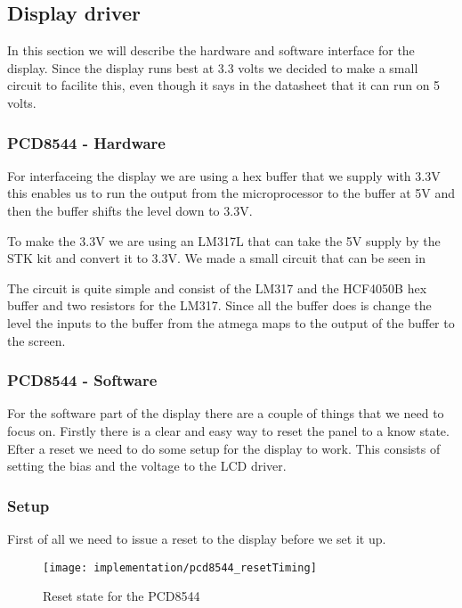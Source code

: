 \subsection{Display driver}
In this section we will describe the hardware and software interface for the display.
Since the display runs best at 3.3 volts we decided to make a small circuit to facilite this, 
even though it says in the datasheet\cite[p. 17]{philips:pcd8544} that it can run on 5 volts.

\subsubsection{PCD8544 - Hardware}
For interfaceing the display we are using a hex buffer that we supply with 3.3V this enables us to run the output from the
microprocessor to the buffer at 5V and then the buffer shifts the level down to 3.3V\cite[p. 1]{STMicroelectronics:HCF4050B}.

To make the 3.3V we are using an LM317L that can take the 5V supply by the STK kit and convert it to 3.3V. 
We made a small circuit that can be seen in 


The circuit is quite simple and consist of the LM317 and the HCF4050B hex buffer and two resistors for the LM317.
Since all the buffer does is change the level the inputs to the buffer from the atmega maps to the output of the buffer to the screen.


\subsubsection{PCD8544 - Software}
For the software part of the display there are a couple of things that we need to focus on. 
Firstly there is a clear and easy way to reset the panel to a know state. Efter a reset we need to do some setup for the display to work.
This consists of setting the bias and the voltage to the LCD driver.

\subsubsection{Setup}
First of all we need to issue a reset to the display before we set it up.

\begin{figure}
	\centering
	\texttt{[image: implementation/pcd8544\_resetTiming]}
	\caption{Reset state for the PCD8544\cite[p. 21]{philips:pcd8544}}
	\label{fig:pcd8544_resetTiming}
\end{figure}

